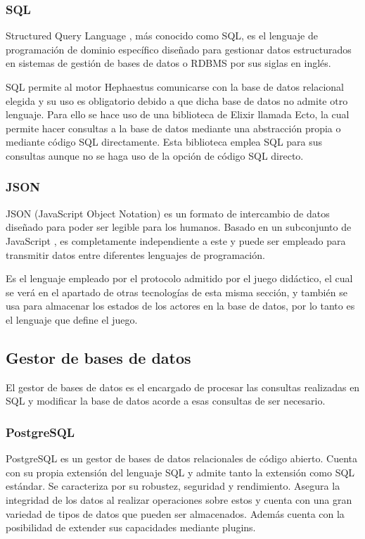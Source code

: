 \subsubsection{SQL}

Structured Query Language \cite{sql}, más conocido como SQL, es el lenguaje de programación de dominio específico diseñado para gestionar datos estructurados en sistemas de gestión de bases de datos o RDBMS por sus siglas en inglés.

SQL permite al motor Hephaestus comunicarse con la base de datos relacional elegida y su uso es obligatorio debido a que dicha base de datos no admite otro lenguaje. Para ello se hace uso de una biblioteca de Elixir llamada Ecto, la cual permite hacer consultas a la base de datos mediante una abstracción propia o mediante código SQL directamente. Esta biblioteca emplea SQL para sus consultas aunque no se haga uso de la opción de código SQL directo.

\subsubsection{JSON}

JSON (JavaScript Object Notation) \cite{json} es un formato de intercambio de datos diseñado para poder ser legible para los humanos. Basado en un subconjunto de JavaScript \cite{javascript}, es completamente independiente a este y puede ser empleado para transmitir datos entre diferentes lenguajes de programación.

Es el lenguaje empleado por el protocolo admitido por el juego didáctico, el cual se verá en el apartado de otras tecnologías de esta misma sección, y también se usa para almacenar los estados de los actores en la base de datos, por lo tanto es el lenguaje que define el juego.

\subsection{Gestor de bases de datos}

El gestor de bases de datos es el encargado de procesar las consultas realizadas en SQL y modificar la base de datos acorde a esas consultas de ser necesario.

\subsubsection{PostgreSQL}

PostgreSQL \cite{postgres} es un gestor de bases de datos relacionales de código abierto. Cuenta con su propia extensión del lenguaje SQL y admite tanto la extensión como SQL estándar. Se caracteriza por su robustez, seguridad y rendimiento. Asegura la integridad de los datos al realizar operaciones sobre estos y cuenta con una gran variedad de tipos de datos que pueden ser almacenados. Además cuenta con la posibilidad de extender sus capacidades mediante plugins.

